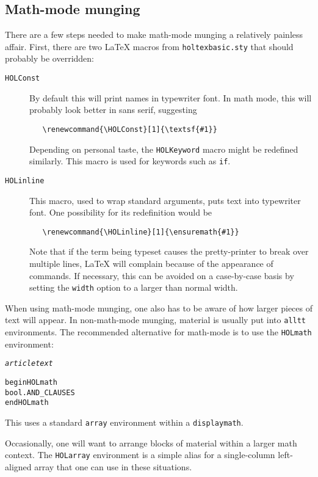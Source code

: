 \subsection{Math-mode munging}
\label{sec:math-mode-munging}

There are a few steps needed to make math-mode munging a relatively painless affair.
First, there are two \LaTeX{} macros from \texttt{holtexbasic.sty} that should probably be overridden:
\begin{description}
\item[\texttt{\bs{}HOLConst}] By default this will print names in typewriter font.
In math mode, this will probably look better in sans serif, suggesting
\begin{verbatim}
   \renewcommand{\HOLConst}[1]{\textsf{#1}}
\end{verbatim}
Depending on personal taste, the \texttt{\bs{}HOLKeyword} macro might be redefined similarly.
This macro is used for keywords such as \texttt{if}.
\item[\texttt{\bs{}HOLinline}] This macro, used to wrap standard \texttt{\holtm} arguments, puts text into typewriter font.
One possibility for its redefinition would be
\begin{verbatim}
   \renewcommand{\HOLinline}[1]{\ensuremath{#1}}
\end{verbatim}
Note that if the term being typeset causes the pretty-printer to break over multiple lines, \LaTeX{} will complain because of the appearance of \texttt{\bs\bs} commands.
If necessary, this can be avoided on a case-by-case basis by setting the \texttt{width} option to a larger than normal width.
\end{description}

When using math-mode munging, one also has to be aware of how larger pieces of text will appear.
In non-math-mode munging, material is usually put into \texttt{alltt} environments.
The recommended alternative for math-mode is to use the \texttt{\bs{}HOLmath} environment:
\begin{alltt}
   \textit{article text}

   \bs{}begin\lb{}HOLmath\rb
   \holthm\lb{}bool.AND_CLAUSES\rb
   \bs{}end\lb{}HOLmath\rb
\end{alltt}
This uses a standard \texttt{array} environment within a \texttt{displaymath}.

Occasionally, one will want to arrange blocks of \HOL{} material within a larger math context.
The \texttt{HOLarray} environment is a simple alias for a single-column left-aligned array that one can use in these situations.



